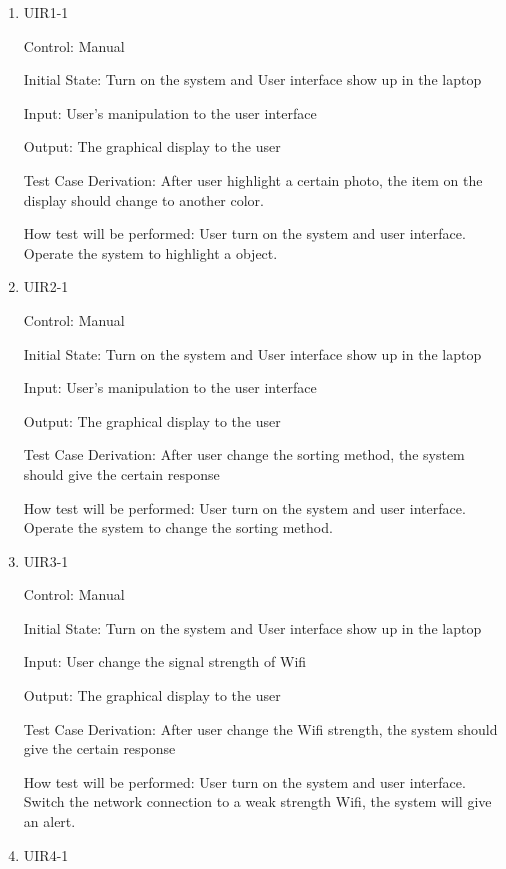 \documentclass[12pt, titlepage]{article}
\begin{document}
\begin{enumerate}

\item{UIR1-1\\}

Control: Manual
					
Initial State: Turn on the system and User interface show up in the laptop
					
Input: User's manipulation to the user interface
					
Output: The graphical display to the user

Test Case Derivation: After user highlight a certain photo, the item on the display should change to another color.
					
How test will be performed: 
	User turn on the system and user interface. Operate the system to highlight a object.		
	
	
\item{UIR2-1\\}

Control: Manual
					
Initial State: Turn on the system and User interface show up in the laptop
					
Input: User's manipulation to the user interface
					
Output: The graphical display to the user

Test Case Derivation: After user change the sorting method, the system should give the certain response
					
How test will be performed: 
	User turn on the system and user interface. Operate the system to change the sorting method.


\item{UIR3-1\\}

Control: Manual
					
Initial State: Turn on the system and User interface show up in the laptop
					
Input: User change the signal strength of Wifi
					
Output: The graphical display to the user

Test Case Derivation: After user change the Wifi strength, the system should give the certain response
					
How test will be performed: 
	User turn on the system and user interface. Switch the network connection to a weak strength Wifi, the system will give an alert.
	
\item{UIR4-1\\}


\end{enumerate}
\end{document}

